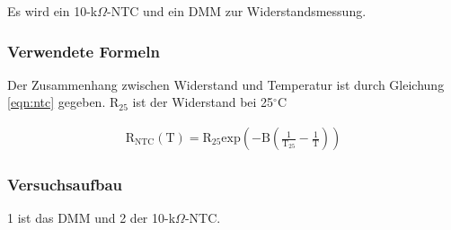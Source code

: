 \documentclass[12pt,a4paper]{article}
\begin{document}
Es wird ein 10-k$\Omega$-NTC und ein DMM zur Widerstandsmessung.

\subsubsection*{Verwendete Formeln}

Der Zusammenhang zwischen Widerstand und Temperatur ist durch Gleichung \ref{eqn:ntc} gegeben. R$_{25}$ ist der Widerstand bei 25$^\circ$C

\begin{align}
\text{R}_\text{NTC}(\text{T}) = \text{R}_{25} \text{exp}\left(-\text{B} \left(\frac{1}{\text{T}_{25}}-\frac{1}{\text{T}}\right)\right)
\label{eqn:ntc}
\end{align}

\subsubsection*{Versuchsaufbau}

1 ist das DMM und 2 der 10-k$\Omega$-NTC.
\end{document}
